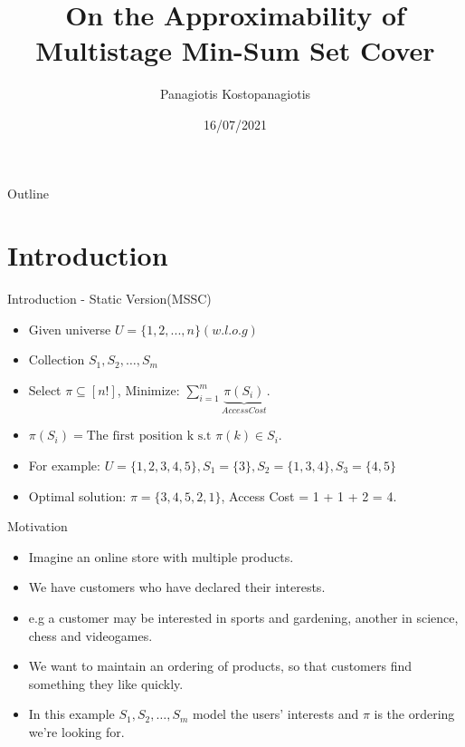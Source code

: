 \documentclass{beamer}
\title{On the Approximability of Multistage Min-Sum Set Cover}
\author{Panagiotis Kostopanagiotis}
\institute{National Technical University of Athens}
\date{16/07/2021}
\begin{document}


\begin{frame}
  \titlepage
\end{frame}


\begin{frame}[plain]
	\tableofcontents
\end{frame}
\begin{frame}{Outline}
  \tableofcontents
\end{frame}

\section{Introduction}

\begin{frame}{Introduction - Static Version(MSSC)}
    \begin{itemize}
         \item Given universe $U = \{ 1, 2, ..., n \} (w.l.o.g)$
         \item Collection $S_1, S_2, \ldots, S_m$
         \item Select $\pi \subseteq [n!]$, Minimize: $\sum_{i=1}^m \underbrace{\pi( S_i )}_{Access Cost}$.
         \item $\pi(S_i) = \text{The first position k s.t } \pi(k) \in S_i$.
         \item For example: $U = \{1,2,3,4,5\}, S_1 = \{3\}, S_2=\{1,3,4\}, S_3 = \{4,5\}$
         \item Optimal solution:  $\pi = \{3,4,5,2,1\}$,  Access Cost = 1 + 1 + 2 = 4.
    \end{itemize}
\end{frame}

\begin{frame}{Motivation}
    \begin{itemize}
         \item Imagine an online store with multiple products.
         \item We have customers who have declared their interests.
         \item e.g a customer may be interested in sports and gardening, another in science, chess and videogames.
         \item We want to maintain an ordering of products, so that customers find something they like quickly.
         \item In this example $S_1, S_2, \ldots, S_m$ model the users' interests and $\pi$ is the ordering we're looking for.
    \end{itemize}
\end{frame}
\end{document}
